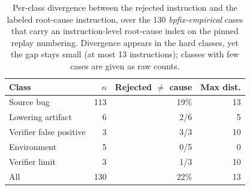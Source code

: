\begin{table}[t]
  \centering
  \caption{Per-class divergence between the rejected instruction and the
  labeled root-cause instruction, over the 130 \emph{bpfix-empirical} cases that
  carry an instruction-level root-cause index on the pinned replay numbering.
  Divergence appears in the hard classes, yet the gap stays small (at most 13
  instructions); classes with few cases are given as raw counts.}
  \label{tab:rejection-cause-gap}
  \small
  \begin{tabular}{@{}l r r r@{}}
    \toprule
    Class & $n$ & Rejected $\neq$ cause & Max dist. \\
    \midrule
    Source bug              & 113 & 19\% & 13 \\
    Lowering artifact       &   6 & 2/6  &  5 \\
    Verifier false positive &   3 & 3/3  & 10 \\
    Environment             &   5 & 0/5  &  0 \\
    Verifier limit          &   3 & 1/3  & 10 \\
    \midrule
    All                     & 130 & 22\% & 13 \\
    \bottomrule
  \end{tabular}
\end{table}
